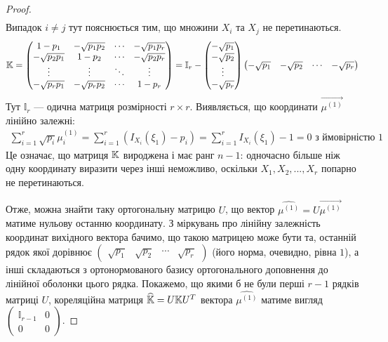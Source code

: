\begin{proof}
\begin{gather*}
    \end{gather*}
    Випадок $i\neq j$ тут пояснюється тим, що множини $X_i$ та $X_j$ не перетинаються.
    \begin{gather*}
        \mathbb{K} = \begin{pmatrix}
            1 - p_1 & -\sqrt{p_1 p_2} & \cdots & -\sqrt{p_1 p_r} \\
            -\sqrt{p_2 p_1} & 1 - p_2 & \cdots & -\sqrt{p_2 p_r} \\
            \vdots & \vdots & \ddots & \vdots \\
            -\sqrt{p_r p_1} & -\sqrt{p_r p_2} & \cdots & 1 - p_r
        \end{pmatrix} = \mathbb{I}_r - 
        \begin{pmatrix}
            -\sqrt{p_1} \\
            -\sqrt{p_2} \\
            \vdots \\
            -\sqrt{p_r}
        \end{pmatrix} 
        \begin{pmatrix}
            -\sqrt{p_1} & -\sqrt{p_2} & \cdots & -\sqrt{p_r}
        \end{pmatrix}
    \end{gather*}
    Тут $\mathbb{I}_r$ --- одична матриця розмірності $r\times r$.
    Виявляється, що координати $\overrightarrow{\mu^{(1)}}$ лінійно залежні:
    \begin{gather*}
        \sum_{i=1}^r \sqrt{p_i} \mu^{(1)}_i = 
        \sum_{i=1}^r \left(I_{X_i}(\xi_1) - p_i\right) = 
        \sum_{i=1}^r I_{X_i}(\xi_1) - 1 = 0 \text{ з ймовірністю } 1
    \end{gather*}
    Це означає, що матриця $\mathbb{K}$ вироджена і має ранг $n-1$: одночасно більше ніж одну координату виразити через інші неможливо,
    оскільки $X_1, X_2, ..., X_r$ попарно не перетинаються. 
    
    Отже, можна знайти таку ортогональну матрицю $U$, що
    вектор $\widehat{\mu^{(1)}} = U \overrightarrow{\mu^{(1)}}$ матиме нульову останню координату. З міркувань про лінійну залежність координат вихідного вектора
    бачимо, що такою матрицею може бути та, останній рядок якої дорівнює 
    $\begin{pmatrix}
        \sqrt{p_1} & \sqrt{p_2} & \cdots & \sqrt{p_r}
    \end{pmatrix}$ (його норма, очевидно, рівна $1$), а інші складаються з ортонормованого базису ортогонального доповнення до лінійної оболонки цього рядка.
    Покажемо, що якими б не були перші $r-1$ рядків матриці $U$, кореляційна матриця $\widehat{\mathbb{K}} = U \mathbb{K} U^{T}$ вектора $\widehat{\mu^{(1)}}$ матиме
    вигляд $\begin{pmatrix}
        \mathbb{I}_{r-1} & 0 \\
        0 & 0 
    \end{pmatrix}$.


\end{proof}
